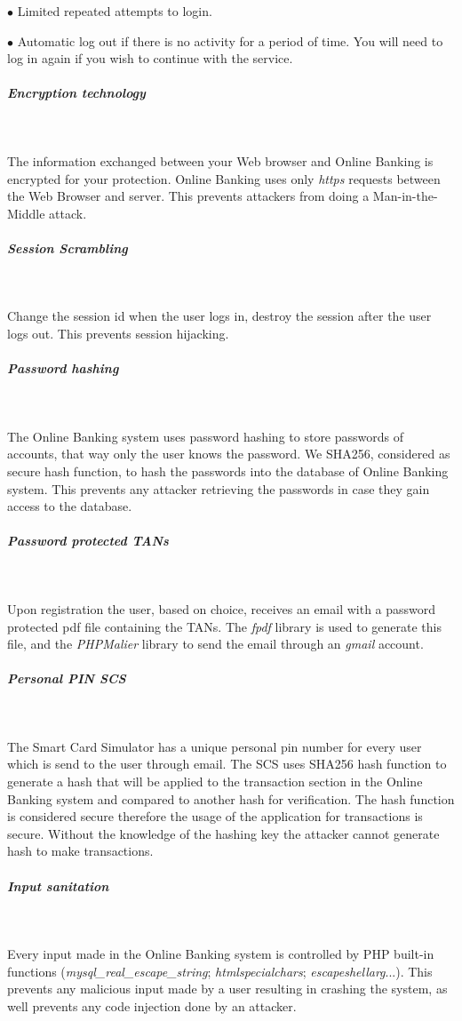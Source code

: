 \documentclass[headsepline,footsepline,footinclude=false,oneside,fontsize=11pt,paper=a4,listof=totoc,bibliography=totoc]{scrbook} %
\begin{document}
$\bullet$ Limited repeated attempts to login.\

$\bullet$ Automatic log out if there is no activity for a period of time. You will need to log in again if you wish to continue with the service.

\subparagraph{Encryption technology}\ 

The information exchanged between your Web browser and Online Banking is encrypted for your protection. Online Banking uses only \textit{https} requests between the Web Browser and server. This prevents attackers from doing a  Man-in-the-Middle attack.

\subparagraph{Session Scrambling}\

Change the session id when the user logs in, destroy the session after the user logs out. This prevents session hijacking.

\subparagraph{Password hashing}\

The Online Banking system uses password hashing to store passwords of accounts, that way only the user knows the password. We SHA256, considered as secure hash function, to hash the passwords into the database of Online Banking system. This prevents any attacker retrieving the passwords in case they gain access to the database.

\subparagraph{Password protected TANs}\

Upon registration the user, based on choice, receives an email with a password protected pdf file containing the TANs. The \textit{fpdf} library is used to generate this file, and the \textit{PHPMalier} library to send the email through an \textit{gmail} account.

\subparagraph{Personal PIN SCS}\

The Smart Card Simulator has a unique personal pin number for every user which is send to the user through email. The SCS uses SHA256 hash function to generate a hash that will be applied to the transaction section in the Online Banking system and compared to another hash for verification. The hash function is considered secure therefore the usage of the application for transactions is secure. Without the knowledge of the hashing key the attacker cannot generate hash to make transactions.

\subparagraph{Input sanitation}\

Every input made in the Online Banking system is controlled by PHP built-in functions (\textit{mysql\_real\_escape\_string}; \textit{htmlspecialchars}; \textit{escapeshellarg}...). This prevents any malicious input made by a user resulting in crashing the system, as well prevents any code injection done by an attacker. 
\end{document}

